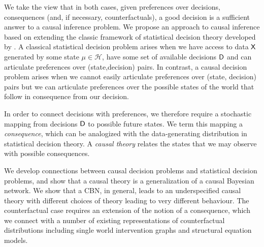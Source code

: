 We take the view that in both cases, given preferences over decisions, consequences (and, if necessary, counterfactuals), a good decision is a sufficient answer to a causal inference problem. We propose an approach to causal inference based on extending the classic framework of statistical decision theory developed by \cite{wald_statistical_1950}. A classical statistical decision problem arises when we have access to data $\mathsf{X}$ generated by some state $\mu\in \mathscr{H}$, have some set of available decisions $\mathsf{D}$ and can articulate preferences over (state,decision) pairs. In contrast, a causal decision problem arises when we cannot easily articulate preferences over (state, decision) pairs but we can articulate preferences over the possible states of the world that follow in consequence from our decision.

In order to connect decisions with preferences, we therefore require a stochastic mapping from decisions $\mathsf{D}$ to possible future states. We term this mapping a \emph{consequence}, which can be analogized with the data-generating distribution in statistical decision theory. A \emph{causal theory} relates the states that we may observe with possible consequences.

We develop connections between causal decision problems and statistical decision problems, and show that a causal theory is a generalization of a causal Bayesian network. We show that a CBN, in general, leads to an underspecified causal theory with different choices of theory leading to very different behaviour. The counterfactual case requires an extension of the notion of a consequence, which we connect with a number of existing representations of counterfactual distributions including single world intervention graphs and structural equation models.


